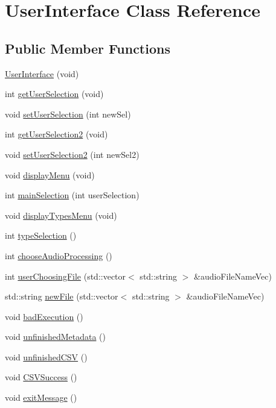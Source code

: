 \hypertarget{classUserInterface}{}\section{User\+Interface Class Reference}
\label{classUserInterface}
\subsection*{Public Member Functions}
\begin{DoxyCompactItemize}
\item 
\hyperlink{classUserInterface_a8b13ec79c20afd56c61280fe63fec837}{User\+Interface} (void)
\item 
int \hyperlink{classUserInterface_aaa6d19efa96815f75b6e5a5612c8ac8c}{get\+User\+Selection} (void)
\item 
void \hyperlink{classUserInterface_aadd67f3f0d6df7cf20807553c7885ba4}{set\+User\+Selection} (int new\+Sel)
\item 
int \hyperlink{classUserInterface_abb90cb9da4b550fa8c0d894f5b433f7f}{get\+User\+Selection2} (void)
\item 
void \hyperlink{classUserInterface_a67883828a7799bf677ab953303d96476}{set\+User\+Selection2} (int new\+Sel2)
\item 
void \hyperlink{classUserInterface_a5145df77b2081085c4ecb264eb718870}{display\+Menu} (void)
\item 
int \hyperlink{classUserInterface_a1d21e648944c255f3879133b26a9c454}{main\+Selection} (int user\+Selection)
\item 
void \hyperlink{classUserInterface_ac78627be5f915f61d87bec9abe6da205}{display\+Types\+Menu} (void)
\item 
int \hyperlink{classUserInterface_a7d5f75f5cadeb5fd99a912f29f918537}{type\+Selection} ()
\item 
int \hyperlink{classUserInterface_a370e52a3e34615a3b5e350d6f83e2011}{choose\+Audio\+Processing} ()
\item 
int \hyperlink{classUserInterface_a6e5d84fffdada2902b796774249a35e8}{user\+Choosing\+File} (std\+::vector$<$ std\+::string $>$ \&audio\+File\+Name\+Vec)
\item 
std\+::string \hyperlink{classUserInterface_a270f8ab101d5d94d556cdea6a7ae9a62}{new\+File} (std\+::vector$<$ std\+::string $>$ \&audio\+File\+Name\+Vec)
\item 
void \hyperlink{classUserInterface_a17bacd55dbd5519b84be8c0c1b996e1c}{bad\+Execution} ()
\item 
void \hyperlink{classUserInterface_ae0937ae35d829ae8e97fac892106a794}{unfinished\+Metadata} ()
\item 
void \hyperlink{classUserInterface_ab7b18b692475bb7f0e420b6c45f68964}{unfinished\+C\+SV} ()
\item 
void \hyperlink{classUserInterface_a2280ccd4003f2de2ace9ca1dd388d394}{C\+S\+V\+Success} ()
\item 
void \hyperlink{classUserInterface_a929a7747d6ea48b93fde9b6cbc4cb584}{exit\+Message} ()
\end{DoxyCompactItemize}



